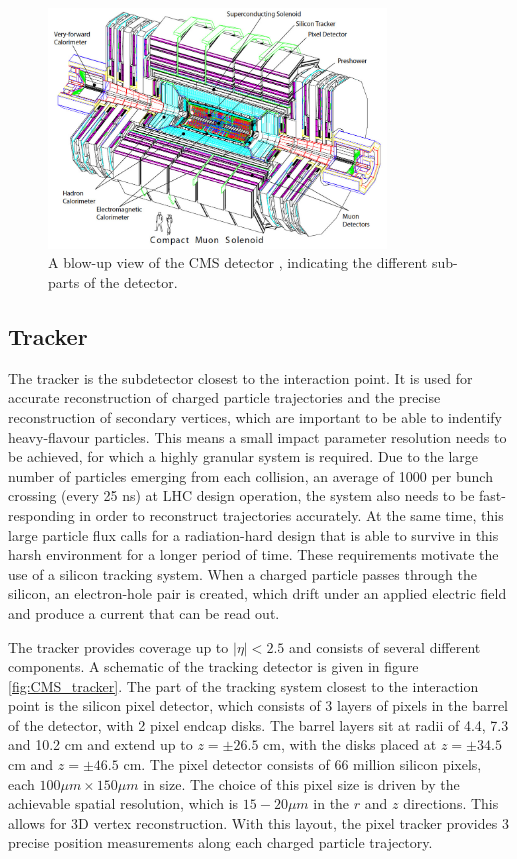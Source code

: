 \begin{figure}[h!]
\includegraphics[width=0.8\textwidth]{./Detector/Plots/cms.png}
\caption{A blow-up view of the \ac{CMS} detector \cite{cms-jinst}, indicating the
different sub-parts of the detector.}
\label{fig:cms_detector}
\end{figure}

\subsection{Tracker}
\label{sec:CMSLHC_CMS_tracker}
The tracker \cite{cms-jinst} is the subdetector closest to the interaction point. It
is used for accurate reconstruction of charged particle trajectories and 
the precise reconstruction of secondary vertices, which are important to be
able to indentify heavy-flavour particles. This means a small impact parameter
resolution needs to be achieved, for which a highly granular system is required. 
Due to the large number of particles emerging from 
each collision, an average of 1000 per bunch crossing (every 25 ns) at LHC design operation, the 
system also needs to be fast-responding in order to reconstruct trajectories accurately.
At the same time, this large particle flux calls for a 
radiation-hard design that is able to survive in this harsh environment
for a longer period of time. These requirements motivate the use of a silicon tracking
system. When a charged particle passes through the silicon, an electron-hole pair
is created, which drift under an applied electric field and produce a current
that can be read out. %

The tracker provides coverage up to $|\eta| < 2.5$ and consists of
several different components. A schematic of the tracking detector is given
in figure \ref{fig:CMS_tracker}. The part of the tracking system
closest to the interaction point is the silicon pixel detector, which 
consists of 3 layers of pixels in the barrel of the detector, with 
2 pixel endcap disks. The barrel layers sit at radii of 4.4, 7.3 and 10.2 cm 
and extend up to $z=\pm 26.5$ cm, with the disks placed at $z=\pm 34.5$ cm and
$z=\pm 46.5$ cm. The pixel detector consists of 66 million silicon pixels, each
$100 \mu m \times 150 \mu m$ in size. The choice of this pixel size is driven
by the achievable spatial resolution, which is $15-20 \mu m$ in the $r$ and $z$ directions.
This allows for 3D vertex reconstruction. With this layout, the pixel tracker
provides 3 precise position measurements along each charged particle trajectory.


